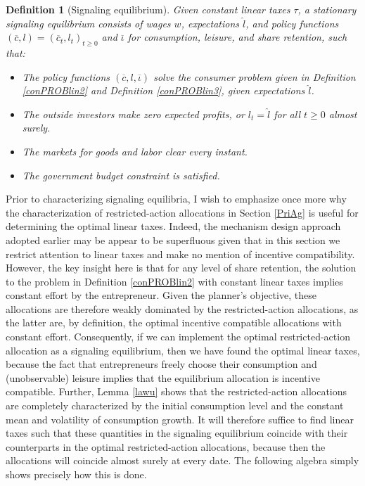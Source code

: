 \documentclass[11pt]{article}
\theoremstyle{plain}
\newtheorem{defn}{Definition}[section]
\begin{document}
\begin{defn}[Signaling equilibrium] \label{SIGE}
Given constant linear taxes $\tau$, a stationary signaling equilibrium consists of wages $w$, expectations $\hat{l}$, and policy functions $(\overline{c},l) = (\overline{c}_t,l_t)_{t\geq0}$ and $\overline{\iota}$ for consumption, leisure, and share retention, such that:
\begin{itemize}
\item The policy functions $(\overline{c},l,\overline{\iota})$ solve the consumer problem given in Definition \ref{conPROBlin2} and Definition \ref{conPROBlin3}, given expectations $\hat{l}$.  
\item The outside investors make zero expected profits, or $l_t = \hat{l}$ for all $t\geq0$ almost surely. 
\item The markets for goods and labor clear every instant. 
\item The government budget constraint is satisfied. 
\end{itemize}
\end{defn} 

Prior to characterizing signaling equilibria, I wish to emphasize once more why the characterization of restricted-action allocations in Section \ref{PriAg} is useful for determining the optimal linear taxes. Indeed, the mechanism design approach adopted earlier may be appear to be superfluous given that in this section we restrict attention to linear taxes and make no mention of incentive compatibility. However, the key insight here is that for any level of share retention, the solution to the problem in Definition \ref{conPROBlin2} with constant linear taxes implies constant effort by the entrepreneur. Given the planner's objective, these allocations are therefore weakly dominated by the restricted-action allocations, as the latter are, by definition, the optimal incentive compatible allocations with constant effort. Consequently, if we can implement the optimal restricted-action allocation as a signaling equilibrium, then we have found the optimal linear taxes, because the fact that entrepreneurs freely choose their consumption and (unobservable) leisure implies that the equilibrium allocation is incentive compatible. Further, Lemma \ref{lawu} shows that the restricted-action allocations are completely characterized by the initial consumption level and the constant mean and volatility of consumption growth. It will therefore suffice to find linear taxes such that these quantities in the signaling equilibrium coincide with their counterparts in the optimal restricted-action allocations, because then the allocations will coincide almost surely at every date. The following algebra simply shows precisely how this is done.
\end{document}
